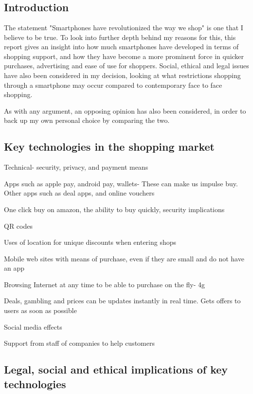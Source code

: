 \chapter{}
\section{Introduction}
The statement "Smartphones have revolutionized the way we shop" is one that I believe to be true. To look into further depth behind my reasons for this, this report gives an insight into how much smartphones have developed in terms of shopping support, and how they have become a more prominent force in quicker purchases, advertising and ease of use for shoppers. Social, ethical and legal issues have also been considered in my decision, looking at what restrictions shopping through a smartphone may occur compared to contemporary face to face shopping. \par
As with any argument, an opposing opinion has also been considered, in order to back up my own personal choice by comparing the two.


\section{Key technologies in the shopping market} 
Technical- security, privacy, and payment means

Apps such as apple pay, android pay, wallets- These can make us impulse buy. Other apps such as deal apps, and online vouchers

One click buy on amazon, the ability to buy quickly, security implications

QR codes

Uses of location for unique discounts when entering shops

Mobile web sites with means of purchase, even if they are small and do not have an app

Browsing Internet at any time to be able to purchase on the fly- 4g

Deals, gambling and prices can be updates instantly in real time. Gets offers to users as soon as possible

Social media effects

Support from staff of companies to help customers

\section{Legal, social and ethical implications of key technologies}

